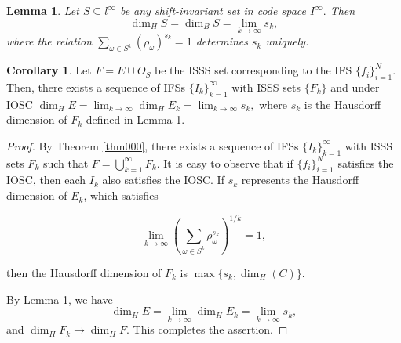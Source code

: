 \documentclass[12pt,oneside,reqno]{amsart}
\newtheorem{lemma}[theorem]{Lemma}
\theoremstyle{definition}
\newtheorem{corollary}[theorem]{Corollary}
\theoremstyle{remark}
\begin{document}
\begin{lemma}{\cite{Liu}}\label{prop90}
    Let $S \subseteq l^{\infty}$ be any shift-invariant set in code space  $I^{\infty}.$ Then 
 $$\dim_{H} S = \dim_B S = \lim_{k \to \infty} s_k,$$
 where the relation $\sum_{\omega \in S^k} (\rho_\omega)^{s_k}=1$ determines $s_k$ uniquely.
 
\end{lemma}
\begin{corollary}
   Let $F= E \cup O_S$ be the ISSS set corresponding to the IFS $\{f_i\}_{i=1}^N.$ Then, there exists a sequence of IFSs $\{I_k\}_{k=1}^{\infty}$ with ISSS sets $\{F_k\}$ and under IOSC $\dim_H E= \lim_{k \to \infty} \dim_H E_k = \lim_{k \to \infty} s_k,$ where $s_k$ is the Hausdorff dimension of $F_k$ defined in Lemma \ref{prop90}.
\end{corollary}
\begin{proof}
By Theorem \ref{thm000}, there exists a sequence of IFSs $\{I_k\}_{k=1}^{\infty}$ with ISSS sets $F_k$ such that $F= \bigcup_{k=1}^\infty F_k.$
 It is easy to observe that if \( \{ f_i \}_{i=1}^N \) satisfies the IOSC, then each \( I_k \) also satisfies the IOSC. 
 If  $s_k$ represents the Hausdorff dimension of $E_k$, which satisfies

\[
\lim_{k \to \infty} \left( \sum_{\omega \in S^k} \rho_\omega^{s_k} \right)^{1/k} = 1,
\]

then the Hausdorff dimension of $F_k$ is $\max\{s_k, \dim_H(C)\}$.

By Lemma \ref{prop90}, we have
\[
\dim_H E = \lim_{k \to \infty} \dim_H E_k = \lim_{k \to \infty} s_k,
\]
and $
\dim_H F_k \to \dim_H F
.$ This completes the assertion. 
\end{proof}
\end{document}

